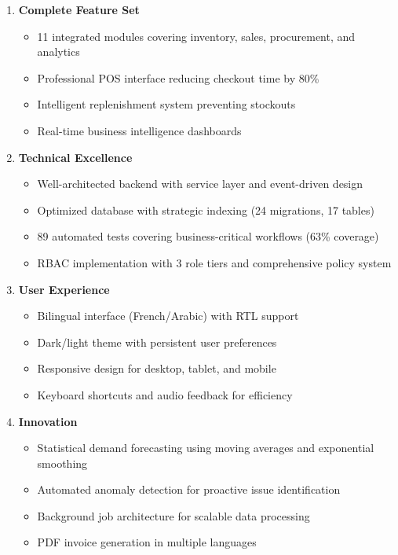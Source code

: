 \begin{enumerate}[leftmargin=*]
    \item \textbf{Complete Feature Set}
    \begin{itemize}
        \item 11 integrated modules covering inventory, sales, procurement, and analytics
        \item Professional POS interface reducing checkout time by 80\%
        \item Intelligent replenishment system preventing stockouts
        \item Real-time business intelligence dashboards
    \end{itemize}
    
    \item \textbf{Technical Excellence}
    \begin{itemize}
        \item Well-architected backend with service layer and event-driven design
        \item Optimized database with strategic indexing (24 migrations, 17 tables)
        \item 89 automated tests covering business-critical workflows (63\% coverage)
        \item RBAC implementation with 3 role tiers and comprehensive policy system
    \end{itemize}
    
    \item \textbf{User Experience}
    \begin{itemize}
        \item Bilingual interface (French/Arabic) with RTL support
        \item Dark/light theme with persistent user preferences
        \item Responsive design for desktop, tablet, and mobile
        \item Keyboard shortcuts and audio feedback for efficiency
    \end{itemize}
    
    \item \textbf{Innovation}
    \begin{itemize}
        \item Statistical demand forecasting using moving averages and exponential smoothing
        \item Automated anomaly detection for proactive issue identification
        \item Background job architecture for scalable data processing
        \item PDF invoice generation in multiple languages
    \end{itemize}
\end{enumerate}

